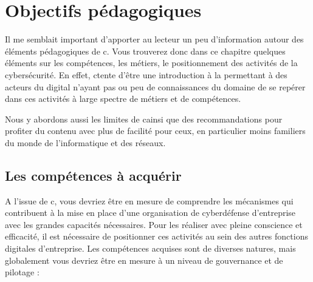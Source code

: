  
\section{Objectifs pédagogiques}
Il me semblait important d'apporter au lecteur un peu d'information autour des éléments pédagogiques de c\ecours. Vous trouverez donc dans ce chapitre quelques éléments sur les compétences, les métiers, le positionnement des activités de la cybersécurité.
En effet, c\ecours tente d'être une introduction à la \etitle permettant à des acteurs du digital n'ayant pas ou peu de connaissances du domaine de se repérer dans ces activités à large spectre de métiers et de compétences.

Nous y abordons aussi les limites de c\ecours ainsi que des recommandations pour profiter du contenu avec plus de facilité pour ceux, en particulier moins familiers du monde de l'informatique et des réseaux.

\subsection{Les compétences à acquérir}
A l'issue de c\ecours, vous devriez être en mesure de comprendre les mécanismes qui contribuent à la mise en place d'une organisation de cyberdéfense d'entreprise avec les grandes capacités nécessaires. Pour les réaliser avec pleine conscience et efficacité, il est nécessaire de positionner ces activités au sein des autres fonctions digitales  d'entreprise. Les compétences acquises sont de diverses natures, mais globalement vous devriez être en mesure à un niveau de gouvernance et de pilotage  :  

